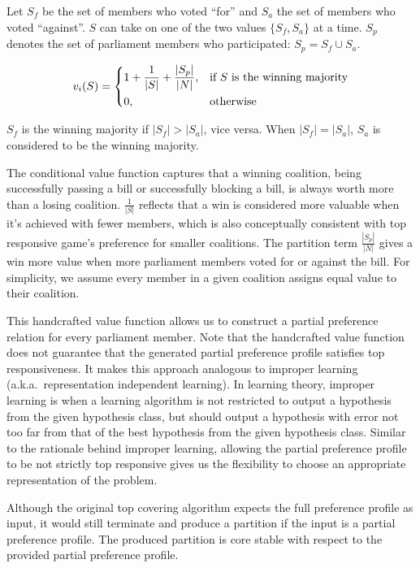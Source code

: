 Let $S_f$ be the set of members who voted ``for'' and
$S_a$ the set of members who voted ``against''.
$S$ can take on one of the two values $\{S_f, S_a\}$ at a time.
$S_p$ denotes the set of parliament members who participated: $S_p = S_f \cup S_a$.

\begin{equation}
\label{eq:value_function}
  v_i(S) =
  \begin{dcases}
      1 + \frac{1}{|S|} + \frac{|S_p|}{|N|},& \text{if $S$ is the winning majority}\\
      0,              & \text{otherwise}
  \end{dcases}
\end{equation}

$S_f$ is the winning majority if $|S_f| > |S_a|$, vice versa. When $|S_f| = |S_a|$, $S_a$ is considered to be the winning majority.

The conditional value function captures that a winning coalition,
being successfully passing a bill or successfully blocking a bill,
is always worth more than a losing coalition.
$\frac{1}{|S|}$ reflects that a win is considered more valuable when it's
achieved with fewer members, which is also conceptually consistent with
top responsive game's preference for smaller coalitions.
The partition term $\frac{|S_p|}{|N|}$ gives a win more value when more
parliament members voted for or against the bill.
For simplicity, we assume every member in a given coalition assigns
equal value to their coalition.

This handcrafted value function allows us to construct a partial preference
relation for every parliament member.
Note that the handcrafted value function does not guarantee that the generated partial preference profile satisfies top responsiveness.
It makes this approach analogous to improper learning (a.k.a.\ representation independent learning).
In learning theory, improper learning is when a learning algorithm is not
restricted to output a hypothesis from the given hypothesis class,
but should output a hypothesis with error not too far from that of
the best hypothesis from the given hypothesis class.
Similar to the rationale behind improper learning, allowing the
partial preference profile to be not strictly top responsive gives us
the flexibility to choose an appropriate representation of the problem.

Although the original top covering algorithm expects the full preference
profile as input, it would still terminate and produce a partition
if the input is a partial preference profile.
The produced partition is core stable with respect to the provided partial
preference profile.

